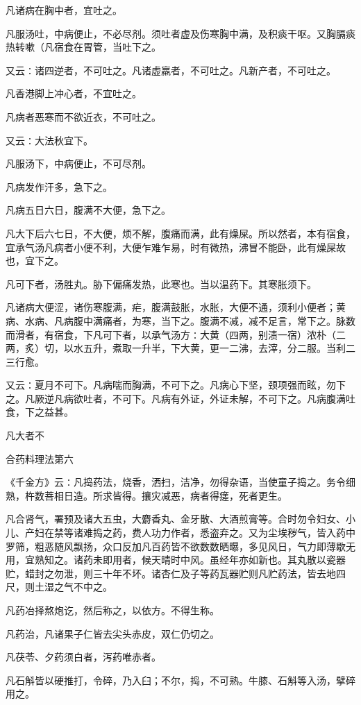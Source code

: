 \documentclass[a4paper,12pt,UTF8,twoside]{ctexbook}
\begin{document}
凡诸病在胸中者，宜吐之。

凡服汤吐，中病便止，不必尽剂。须吐者虚及伤寒胸中满，及积痰干呕。又胸膈痰热转嗽（凡宿食在胃管，当吐下之。

又云∶诸四逆者，不可吐之。凡诸虚羸者，不可吐之。凡新产者，不可吐之。

凡香港脚上冲心者，不宜吐之。

凡病者恶寒而不欲近衣，不可吐之。

又云∶大法秋宜下。

凡服汤下，中病便止，不可尽剂。

凡病发作汗多，急下之。

凡病五日六日，腹满不大便，急下之。

凡大下后六七日，不大便，烦不解，腹痛而满，此有燥屎。所以然者，本有宿食，宜承气汤凡病者小便不利，大便乍难乍易，时有微热，沸冒不能卧，此有燥屎故也，宜下之。

凡可下者，汤胜丸。胁下偏痛发热，此寒也。当以温药下。其寒胀须下。

凡诸病大便涩，诸伤寒腹满，疟，腹满鼓胀，水胀，大便不通，须利小便者；黄病、水病、凡病腹中满痛者，为寒，当下之。腹满不减，减不足言，常下之。脉数而滑者，有宿食，下凡可下者，以承气汤方∶大黄（四两，别渍一宿）浓朴（二两，炙）切，以水五升，煮取一升半，下大黄，更一二沸，去滓，分二服。当利二三行愈。

又云∶夏月不可下。凡病喘而胸满，不可下之。凡病心下坚，颈项强而眩，勿下之。凡厥逆凡病欲吐者，不可下。凡病有外证，外证未解，不可下之。凡病腹满吐食，下之益甚。

凡大者不




合药料理法第六

《千金方》云∶凡捣药法，烧香，洒扫，洁净，勿得杂语，当使童子捣之。务令细熟，杵数菩相日造。所求皆得。攘灾减恶，病者得瘥，死者更生。

凡合肾气，署预及诸大五虫，大麝香丸、金牙散、大酒煎膏等。合时勿令妇女、小儿、产妇在禁等诸难捣之药，费人功力作者，悉盗弃之。又为尘埃秽气，皆入药中罗筛，粗恶随风飘扬，众口反加凡百药皆不欲数数晒曝，多见风日，气力即薄歇无用，宜熟知之。诸药未即用者，候天晴时中风。虽经年亦如新也。其丸散以瓷器贮，蜡封之勿泄，则三十年不坏。诸杏仁及子等药瓦器贮则凡贮药法，皆去地四尺，则土湿之气不中之。

凡药冶择熬炮讫，然后称之，以依方。不得生称。

凡药治，凡诸果子仁皆去尖头赤皮，双仁仍切之。

凡茯苓、夕药须白者，泻药唯赤者。

凡石斛皆以硬推打，令碎，乃入臼；不尔，捣，不可熟。牛膝、石斛等入汤，擘碎用之。
\end{document}
